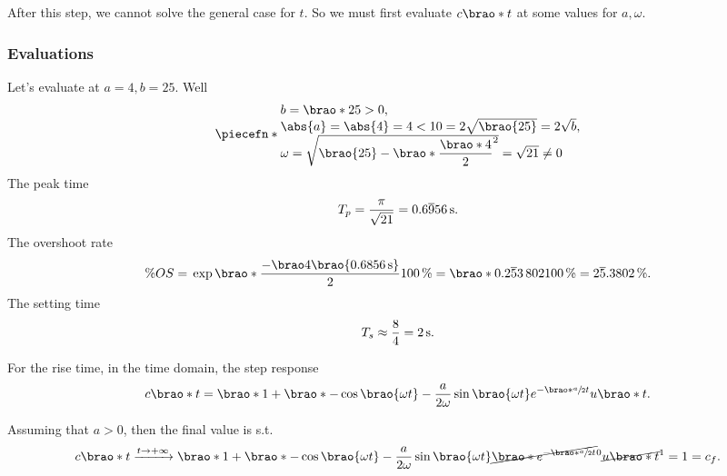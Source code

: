 \documentclass[12pt]{article}
\newcommand*\siexpr[2][]{\SI[parse-numbers=false,#1]{#2}}%
\DeclarePairedDelimiter\brao()%
\DeclarePairedDelimiter\abs||
\DeclarePairedDelimiter\piecefn\{.
\begin{document}
\begin{enumerate}[(a)]
        After this step, we cannot solve the general case for $t$. So we must first evaluate $c\brao*t$ at some values for $a, \omega$.

        \subsubsection{Evaluations}
        Let's evaluate at $a = 4, b = 25$. Well
        \begin{equation}
            \piecefn*{
                \begin{array}{@{}l@{}}
                    b = \brao*{25} > 0,
                \\*
                    \abs{a} = \abs{4} = 4 < 10 = 2\sqrt{\brao{25}} = 2\sqrt{b},
                \\*
                    \omega = \sqrt{\brao{25} - \brao*{\dfrac{\brao*4}2}^2} = \sqrt{21} \not= 0
                \\*
                \end{array}
            }
        \end{equation}
        The peak time
        \begin{equation}
            T_p = \frac\pi{\sqrt{21}} = \siexpr{0.6\overline956}\second.
        \end{equation}
        The overshoot rate
        \begin{equation}
                \% OS
                ={} \exp\brao*{\frac{-\brao4\brao{\SI{0.6856}\second}}2} \SI{100}\percent
                = \brao*{0.2\overline53\,802}{\SI{100}\percent}
                = \siexpr{2\overline5.3802}\percent.
        \end{equation}
        The setting time
        \begin{equation}
            T_s \approx \frac84 = \SI2\second.
        \end{equation}

        For the rise time, in the time domain, the step response
        \begin{equation}
            \begin{aligned}
                c\brao*t = \brao*{1 + \brao*{-\cos\brao{\omega t} - \frac{a}{2\omega} \sin\brao{\omega t} }{e^{-\brao*{\sfrac{a}2}t}}}u\brao*t.
            \end{aligned}
        \end{equation}

        Assuming that $a > 0$, then the final value is s.t.
        \begin{equation}
            c\brao*t
            \xrightarrow{t\to+\infty} \brao*{1 + \brao*{-\cos\brao{\omega t} - \frac{a}{2\omega} \sin\brao{\omega t} }\cancel{\brao*{e^{-\brao*{\sfrac{a}2}t}}}^0} \cancel{u\brao*t}^1 = 1 = c_f.
        \end{equation}


\end{enumerate}
\end{document}
